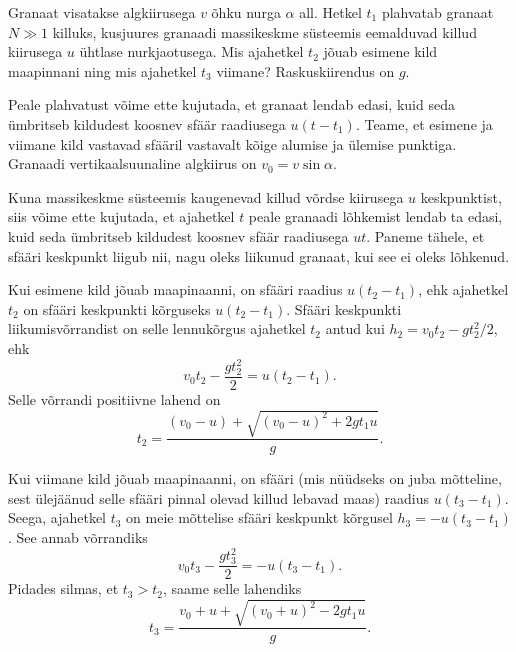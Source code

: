 
Granaat visatakse algkiirusega $v$ õhku nurga $\alpha$ all. Hetkel $t_1$ plahvatab granaat $N\gg1$ killuks, kusjuures granaadi massikeskme süsteemis eemalduvad killud kiirusega $u$ ühtlase nurkjaotusega. Mis ajahetkel $t_2$ jõuab esimene kild maapinnani ning mis ajahetkel $t_3$ viimane? Raskuskiirendus on $g$. 

\hint
Peale plahvatust võime ette kujutada, et granaat lendab edasi, kuid seda ümbritseb kildudest koosnev sfäär raadiusega $u(t-t_1)$. Teame, et esimene ja viimane kild vastavad sfääril vastavalt kõige alumise ja ülemise punktiga.\solu
Granaadi vertikaalsuunaline algkiirus on $v_0=v\sin\alpha$.

Kuna massikeskme süsteemis kaugenevad killud võrdse kiirusega $u$ keskpunktist, siis võime ette kujutada, et ajahetkel $t$ peale granaadi lõhkemist lendab ta edasi, kuid seda ümbritseb kildudest koosnev sfäär raadiusega $ut$. Paneme tähele, et sfääri keskpunkt liigub nii, nagu oleks liikunud granaat, kui see ei oleks lõhkenud.

Kui esimene kild jõuab maapinaanni, on sfääri raadius $u(t_2-t_1)$, ehk ajahetkel $t_2$ on sfääri keskpunkti kõrguseks $u(t_2-t_1)$. Sfääri keskpunkti liikumisvõrrandist on selle lennukõrgus ajahetkel $t_2$ antud kui $h_2=v_0t_2-gt_2^2/2$, ehk
$$
v_0t_2-\frac{gt_2^2}{2}=u(t_2-t_1).
$$
Selle võrrandi positiivne lahend on
\[
t_2=\frac{(v_0-u)+\sqrt{(v_0-u)^2+2gt_1u}}{g}.
\]

Kui viimane kild jõuab maapinaanni, on sfääri (mis nüüdseks on juba mõtteline, sest ülejäänud selle sfääri pinnal olevad killud lebavad maas) raadius $u(t_3-t_1)$. Seega, ajahetkel $t_3$ on meie mõttelise sfääri keskpunkt kõrgusel $h_3=-u(t_3-t_1)$. See annab võrrandiks
$$
v_0t_3-\frac{gt_3^2}{2}=-u(t_3-t_1).
$$
Pidades silmas, et $t_3>t_2$, saame selle lahendiks
\[
t_3=\frac{v_0+u+\sqrt{(v_0+u)^2-2gt_1u}}{g}.
\]\probend